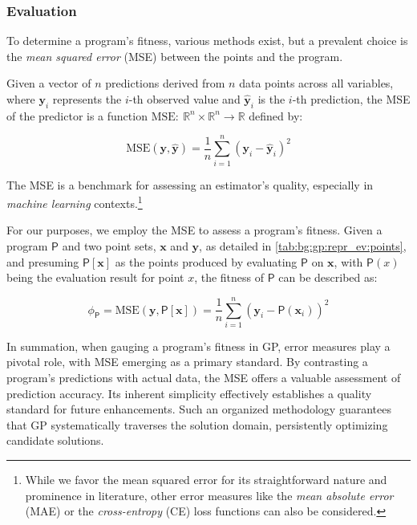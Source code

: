 
\subsubsection{Evaluation}
\label{sec:bg:gp:repr_ev:eval}
  To determine a program's fitness, various methods exist, but a prevalent 
  choice is the \emph{mean squared error} (MSE) between the points and the 
  program.

  \begin{definition}
  \label{def:mse}
    Given a vector of \(n\) predictions derived from \(n\) data points across 
    all variables, where \(\mathbf{y}_i\) represents the \(i\)-th observed 
    value and \(\hat{\mathbf{y}}_i\) is the \(i\)-th prediction, the MSE of the 
    predictor is a function \(\mathrm{MSE}:\: \mathbb{R}^n \times \mathbb{R}^n 
    \to \mathbb{R}\) defined by:

    \begin{equation}
    \label{eq:mse}
      \mathrm{MSE}(\mathbf{y}, \hat{\mathbf{y}}) = 
        \frac{1}{n} \sum_{i=1}^{n} (\mathbf{y}_i - \hat{\mathbf{y}}_i)^2
    \end{equation}
  \end{definition}

  The MSE is a benchmark for assessing an estimator's quality, especially in 
  \textit{machine learning} contexts.\footnote{
    While we favor the mean squared error for its straightforward nature and 
    prominence in literature, other error measures like the \textit{mean 
    absolute error} (MAE) or the \textit{cross-entropy} (CE) loss functions can 
    also be considered.
  }

  For our purposes, we employ the MSE to assess a program's fitness. Given a 
  program \(\mathsf{P}\) and two point sets, \(\mathbf{x}\) and \(\mathbf{y}\), 
  as detailed in \vref{tab:bg:gp:repr_ev:points}, and presuming 
  \(\mathsf{P}[\mathbf{x}]\) as the points produced by evaluating 
  \(\mathsf{P}\) on \(\mathbf{x}\), with \(\mathsf{P}(x)\) being the evaluation 
  result for point \(x\), the fitness of \(\mathsf{P}\) can be described as:

  \begin{equation}
  \label{eq:bg:gp:repr_ev:fitness}
    \phi_\mathsf{P} = \mathrm{MSE}(\mathbf{y}, \mathsf{P}[\mathbf{x}]) = 
      \frac{1}{n} \sum_{i=1}^{n} (\mathbf{y}_i - \mathsf{P}(\mathbf{x}_i))^2
  \end{equation}

  In summation, when gauging a program's fitness in GP, error measures play a 
  pivotal role, with MSE emerging as a primary standard. By contrasting a 
  program's predictions with actual data, the MSE offers a valuable assessment 
  of prediction accuracy. Its inherent simplicity effectively establishes a 
  quality standard for future enhancements. Such an organized methodology 
  guarantees that GP systematically traverses the solution domain, persistently 
  optimizing candidate solutions.
